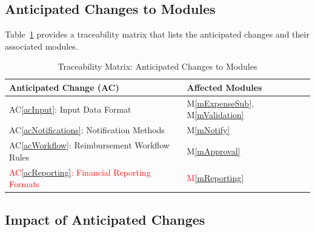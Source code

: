 \documentclass[12pt, titlepage]{article}
\newcommand{\acref}[1]{AC\ref{#1}}
\newcommand{\mref}[1]{M\ref{#1}}
\begin{document}
\subsection{Anticipated Changes to Modules}

Table~\ref{tab:anticipated-changes} provides a traceability matrix that lists the anticipated changes and their associated modules.

\begin{table}[h!]
\centering
\caption{Traceability Matrix: Anticipated Changes to Modules}
\label{tab:anticipated-changes}
\begin{tabular}{|p{6cm}|p{8cm}|}
\hline
\textbf{Anticipated Change (AC)} & \textbf{Affected Modules} \\
\hline
\acref{acInput}: Input Data Format & \mref{mExpenseSub}, \mref{mValidation} \\ %
\hline
\acref{acNotifications}: Notification Methods & \mref{mNotify} \\ %
\hline
\acref{acWorkflow}: Reimbursement Workflow Rules & \mref{mApproval} \\ %
\hline
\textcolor{red}{\acref{acReporting}: Financial Reporting Formats} & \textcolor{red}{\mref{mReporting}} \\ %
\hline
\end{tabular}
\end{table}

\subsection{Impact of Anticipated Changes}
\end{document}
